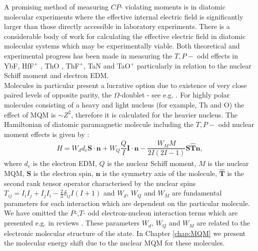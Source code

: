 \documentclass[10pt,a4paper, twoside, openright]{report}
\begin{document}
\linebreak
 A promising method of measuring $CP$- violating moments is in diatomic molecular experiments where the effective internal electric field is significantly larger than those directly accessible in laboratory experiments.  There is a considerable body of work for calculating the effective electric field in diatomic molecular systems which may be experimentally viable. Both theoretical and experimental progress has been made in measuring the $T,P-$ odd effects in  YbF\cite{Hudson2011, Mosyagin1998, Quiney1998, Parpia1998, Kozlov1994, Nayak2009, Steimle2007, Abe2014}, HfF$^+$ \cite{Cossel2012, Loh2013, Petrov2007, Fleig2013, Meyer2006, Skripnikov2008Hf, Le2013, Skripnikov2017Hf, Cairncross2017}, ThO \cite{Petrov2014, Meyer2008, Skripnikov2013ThO, Skripnikov2014ThO, Titov2015ThO, Fleig2014, Denis2016, Baron2017}, ThF$^+$\cite{Loh2013, Skripnikov2015Th, Denis2015}, TaN \cite{Skripnikov2015Ta, Fleig2016TaN} and TaO$^+$ \cite{Fleig2018} particularly in relation to the nuclear Schiff moment and electron EDM.\\
 \linebreak 
Molecules in particular present a lucrative option due to existence of very close paired levels of opposite parity, the  $\Omega$-doublet - see e.g.  \cite{Flambaum2014}. For highly polar molecules consisting of a heavy and light nucleus (for example, Th and O) the effect of MQM is $\sim Z^2$, therefore it is calculated for the heavier nucleus. The Hamiltonian of diatomic paramagnetic molecule including the $T, P-$ odd nuclear moment effects is given by \cite{SFK1984,Kozlov1995}:
\begin{align}
H = W_d d_e \mathbf{S}\cdot\mathbf{n} + W_{Q}\dfrac{Q}{I}\mathbf{I}\cdot\mathbf{n} - \dfrac{W_{M}M}{2I(2I -1)}\mathbf{S}\hat{\mathbf{T}}\mathbf{n},
\end{align}
where $d_e$ is the electron EDM, $Q$ is the nuclear Schiff moment, $M$ is the nuclear MQM, $\mathbf{S}$ is the electron spin, $\mathbf{n}$ is the symmetry axis of the molecule, $\hat{\mathbf{T}} $ is the second rank tensor operator characterised by the nuclear spins $T_{ij} = I_iI_j + I_jI_i - \tfrac{2}{3}\delta_{ij}I(I + 1)$  and  $W_d$, $W_Q$ and $W_M$ are fundamental parameters for each interaction which are dependent on the particular molecule. We have omitted the $P$-,$T$- odd electron-nucleon interaction terms which are presented e.g. in reviews \cite{Safronova2017,GF2004}. 
These parameters $W_d$, $W_Q$ and $W_M$
are related to the electronic molecular structure of the state. In Chapter \ref{chap:MQM} we present the molecular energy shift due to the nuclear MQM for these molecules.
 
\end{document}
